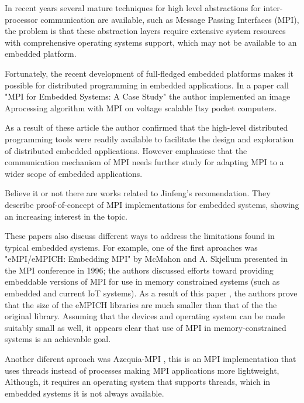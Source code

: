 In recent years several mature techniques for high level abstractions for
inter-processor communication are available, such as Message Passing Interfaces
(MPI), the problem is that these abstraction layers require extensive
system resources with comprehensive operating systems support, which may not be
available to an embedded platform.

Fortunately, the recent development of full-fledged embedded platforms makes 
it possible for distributed programming in embedded applications. In a paper
call "MPI for Embedded Systems: A Case Study" the author implemented an image
Aprocessing algorithm with MPI on voltage scalable Itsy pocket computers. 

As a result of these article the author confirmed that the high-level distributed 
programming tools were readily available to facilitate the design and 
exploration of distributed embedded applications. However emphasiese that the 
communication mechanism of MPI needs further study for adapting MPI to a wider 
scope of embedded applications.

Believe it or not there are works 
\cite{Saldana} \cite{Gallego} \cite{McMahon} related to Jinfeng's
recomendation. They describe proof-of-concept of MPI implementations for 
embedded systems, showing an increasing interest in the topic. 

These papers also discuss different ways to address the limitations found in 
typical embedded systems. For example, one of the first aproaches was 
"eMPI/eMPICH: Embedding MPI" by
McMahon and A. Skjellum presented in the MPI conference in 1996; the authors 
discussed efforts toward providing embeddable versions of MPI for use in 
memory constrained systems (such as embedded and
current IoT systems). As a result of this paper , the authors prove that the
size of the eMPICH libraries are much smaller than that of the
the original library. Assuming that the devices  and operating system
can be made suitably small as well, it appears clear that use of MPI in
memory-constrained systems is an achievable goal.

Another diferent aproach was Azequia-MPI \cite{Gallego}, this is an MPI 
implementation that uses threads instead of processes making MPI applications 
more lightweight, Although, it requires an operating system that supports 
threads, which in embedded systems it is not always available. 

